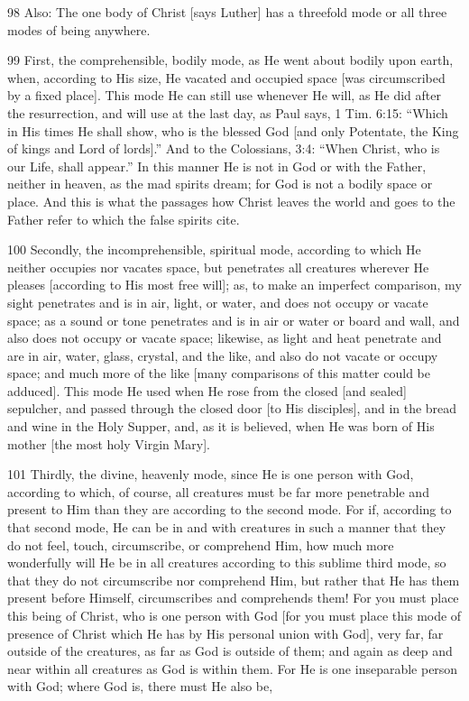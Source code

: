 98 Also: The one body of Christ [says Luther] has a threefold mode or all three modes of being anywhere.

99 First, the comprehensible, bodily mode, as He went about bodily upon earth, when, according to His size, He vacated and occupied space [was circumscribed by a fixed place]. This mode He can still use whenever He will, as He did after the resurrection, and will use at the last day, as Paul says, 1 Tim. 6:15: “Which in His times He shall show, who is the blessed God [and only Potentate, the King of kings and Lord of lords].” And to the Colossians, 3:4: “When Christ, who is our Life, shall appear.” In this manner He is not in God or with the Father, neither in heaven, as the mad spirits dream; for God is not a bodily space or place. And this is what the passages how Christ leaves the world and goes to the Father refer to which the false spirits cite.

100 Secondly, the incomprehensible, spiritual mode, according to which He neither occupies nor vacates space, but penetrates all creatures wherever He pleases [according to His most free will]; as, to make an imperfect comparison, my sight penetrates and is in air, light, or water, and does not occupy or vacate space; as a sound or tone penetrates and is in air or water or board and wall, and also does not occupy or vacate space; likewise, as light and heat penetrate and are in air, water, glass, crystal, and the like, and also do not vacate or occupy space; and much more of the like [many comparisons of this matter could be adduced]. This mode He used when He rose from the closed [and sealed] sepulcher, and passed through the closed door [to His disciples], and in the bread and wine in the Holy Supper, and, as it is believed, when He was born of His mother [the most holy Virgin Mary].

101 Thirdly, the divine, heavenly mode, since He is one person with God, according to which, of course, all creatures must be far more penetrable and present to Him than they are according to the second mode. For if, according to that second mode, He can be in and with creatures in such a manner that they do not feel, touch, circumscribe, or comprehend Him, how much more wonderfully will He be in all creatures according to this sublime third mode, so that they do not circumscribe nor comprehend Him, but rather that He has them present before Himself, circumscribes and comprehends them! For you must place this being of Christ, who is one person with God [for you must place this mode of presence of Christ which He has by His personal union with God], very far, far outside of the creatures, as far as God is outside of them; and again as deep and near within all creatures as God is within them. For He is one inseparable person with God; where God is, there must He also be,

